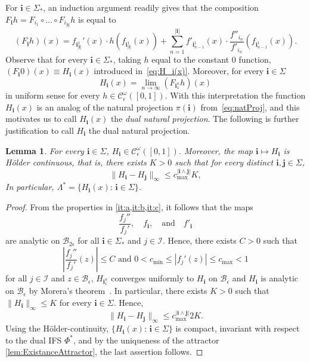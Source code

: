 \documentclass[11pt,]{article}
\def\cref#1{\ref{#1}}%
\newtheorem{lemma}[theorem]{Lemma}
\theoremstyle{definition}
\theoremstyle{remark}
\newcommand{\0}{\mathbf{0}}
\newcommand{\bi}{\mathbf{i}}
\newcommand{\bj}{\mathbf{j}}
\begin{document}
For $\bi\in\Sigma_*$, an induction argument readily gives that the composition
$F_{\bi}h=F_{i_1}\circ\ldots\circ F_{i_{|\bi|}}h$ is equal to
\begin{equation*}%
	(F_{\bi}h)(x) = f_{\bi_{|\bi|}^1}'(x)\cdot h(f_{\bi_{|\bi|}^1}(x)) + \sum_{n=1}^{|\bi|}
	f'_{\bi_{n-1}^1}(x) \cdot 
	\frac{f''_{i_n}}{f'_{i_n}}(f_{\bi_{n-1}^1}(x)).
\end{equation*}
Observe that for every $\bi\in\Sigma_*$, taking $h$ equal to the constant $0$ function, $(F_{\bi}0)(x)\equiv H_{\bi}(x)$ introduced
in~\cref{eq:H_i(x)}. Moreover, for every $\bi\in\Sigma$
\begin{equation*}%
	H_{\bi}(x)=\lim_{n\to\infty}(F_{\bi_1^n}h)(x)
\end{equation*}
in uniform sense for every $h\in\mathcal{C}_\epsilon^\omega([0,1])$. With this interpretation the function $H_{\bi}(x)$ is an analog of the natural projection $\pi(\bi)$ from~\cref{eq:natProj}, and this motivates us to call $H_{\bi}(x)$ the \emph{dual natural projection}. The following is further justification to call $H_{\bi}$ the dual natural projection.
\begin{lemma}\label{thm:H_iAnalytic}
	For every $\bi\in\Sigma$, $H_{\bi}\in\mathcal{C}_\epsilon^{\omega}([0,1])$. Moreover, the map $\bi\mapsto H_{\bi}$ is H\"older continuous, that is, there exists $K>0$ such that for every distinct $\bi,\bj\in\Sigma$,
	\begin{equation*}%
		\|H_{\bi}-H_{\bj}\|_\infty\leq c_{\max}^{|\bi\wedge\bj|}K,
	\end{equation*}
	In particular, $\Lambda^*=\{H_{\bi}(x):\, \bi\in\Sigma\}$.
\end{lemma}

\begin{proof}
 From the properties in \cref{it:a,it:b,it:c}, it follows that the maps
 \[
 \frac{f_j''}{f_j'},\quad f_{\bi}, \quad\text{and} \quad f'_{\bi}
 \]
 are analytic on $\mathcal{B}_{2\epsilon}$ for all $\bi\in\Sigma_*$ and $j\in\mathcal{I}$. Hence, there exists $C>0$ such that
	\[
	\left|\frac{f_j''}{f_j'}(z)\right| \leq C\text{ and }0<c_{\min}\leq|f_j'(z)|\leq c_{\max}<1
	\]
	for all $j\in\mathcal{I}$ and $z\in\mathcal{B}_{\epsilon}$, $H_{\bi_1^n}$ converges uniformly to $H_{\bi}$ on $\mathcal{B}_{\epsilon}$
	and $H_{\bi}$ is analytic on $\mathcal{B}_{\epsilon}$ by Morera's theorem~\cite[Theorem 10.17]{Rudin_AnalysisBook}. In particular, there exists $K>0$ such that $\|H_{\bi}\|_\infty\leq K$ for every $\bi\in\Sigma$. Hence,
	$$
	\|H_{\bi}-H_{\bj}\|_\infty\leq c_{\max}^{|\bi\wedge\bj|}2K.
	$$
	Using the H\"older-continuity, $\{H_{\bi}(x):\, \bi\in\Sigma\}$ is compact, invariant with respect to the dual IFS $\Phi^*$, and by the uniqueness of the attractor \cref{lem:ExistanceAttractor}, the last assertion follows.
\end{proof}
\end{document}

